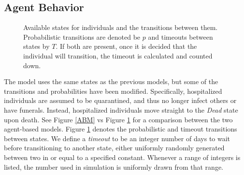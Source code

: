\subsection{Agent Behavior}
\begin{figure}[h!]
\begin{center}
\end{center}
\caption{Available states for individuals and the transitions between them. Probabilistic transitions are denoted be $p$ and timeouts between states by $T$. If both are present, once it is decided that the individual will transition, the timeout is calculated and counted down.}
\label{fig:sabm-states}
\end{figure}

The model uses the same states as the previous models, but some of the transitions and probabilities have been modified. Specifically, hospitalized individuals are assumed to be quarantined, and thus no longer infect others or have funerals. Instead, hospitalized individuals move straight to the \emph{Dead} state upon death. See Figure \ref{ABM} vs Figure \ref{fig:sabm-states} for a comparison between the two agent-based models. Figure \ref{fig:sabm-states} denotes the probabilistic and timeout transitions between states. We define a \emph{timeout} to be an integer number of days to wait before transitioning to another state, either uniformly randomly generated between two in or equal to a specified constant. Whenever a range of integers is listed, the number used in simulation is uniformly drawn from that range.

